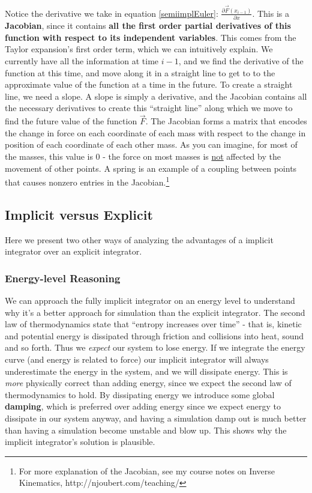 \documentclass[]{article}
\begin{document}
Notice the derivative we take in equation \ref{semiimplEuler}: $\frac{\partial \vec{F}(x_{i-1})}{\partial x}$. This is a \textbf{Jacobian}, since it contains \textbf{all the first order partial derivatives of this function with respect to its independent variables}. This comes from the Taylor expansion's first order term, which we can intuitively explain. We currently have all the information at time $i-1$, and we find the derivative of the function at this time, and move along it in a straight line to get to to the approximate value of the function at a time in the future. To create a straight line, we need a slope. A slope is simply a derivative, and the Jacobian contains all the necessary derivatives to create this ``straight line'' along which we move to find the future value of the function $\vec{F}$. The Jacobian forms a matrix that encodes the change in force on each coordinate of each mass with respect to the change in position of each coordinate of each other mass. As you can imagine, for most of the masses, this value is 0 - the force on most masses is \underline{not} affected by the movement of other points. A spring is an example of a coupling between points that causes nonzero entries in the Jacobian.\footnote{For more explanation of the Jacobian, see my course notes on Inverse Kinematics, http://njoubert.com/teaching/}

\subsection{Implicit versus Explicit}

Here we present two other ways of analyzing the advantages of a implicit integrator over an explicit integrator.

\subsubsection{Energy-level Reasoning}

We can approach the fully implicit integrator on an energy level to understand why it's a better approach for simulation than the explicit integrator. The second law of thermodynamics state that ``entropy increases over time'' - that is, kinetic and potential energy is dissipated through friction and collisions into heat, sound and so forth. Thus we \emph{expect} our system to lose energy. If we integrate the energy curve (and energy is related to force) our implicit integrator will always underestimate the energy in the system, and we will dissipate energy. This is \emph{more} physically correct than adding energy, since we expect the second law of thermodynamics to hold. By dissipating energy we introduce some global \textbf{damping}, which is preferred over adding energy since we expect energy to dissipate in our system anyway, and having a simulation damp out is much better than having a simulation become unstable and blow up. This shows why the implicit integrator's solution is plausible.
\end{document}
